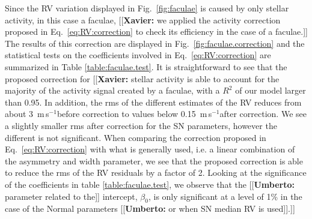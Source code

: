 \documentclass{aa}
\def\ms{\hbox{\,m\,s$^{-1}$}}         %
\newcommand{\xavier}[1]{{\color{blue}[[\textbf{Xavier: }#1]]}}
\newcommand{\umberto}[1]{{\color{green}[[\textbf{Umberto: }#1]]}}
\begin{document}
Since the RV variation displayed in Fig.~\ref{fig:faculae} is caused by only stellar activity, in this case a faculae, \xavier{we applied the activity correction proposed in Eq.~\ref{eq:RV:correction} to check its efficiency in the case of a faculae.} The results of this correction are displayed in Fig.~\ref{fig:faculae.correction} and the statistical tests on the coefficients involved in Eq.~\ref{eq:RV:correction} are summarized in Table \ref{table:faculae.test}. 
It is straightforward to see that the proposed correction for \xavier{stellar activity is able to account for the majority of the activity signal created by a faculae, with a $R^2$ of our model larger than 0.95. In addition, the rms of the different estimates of the RV reduces from about 3 \ms before correction to values below 0.15 \ms after correction.
We see a slightly smaller rms after correction for the SN parameters, however the different is not significant. When comparing the correction proposed in Eq.~\ref{eq:RV:correction} with what is generally used, i.e. a linear combination of the asymmetry and width parameter, we see that the proposed correction is able to reduce the rms of the RV residuals by a factor of 2. Looking at the significance of the coefficients in table \ref{table:faculae.test}, we observe that the \umberto{parameter related to the} intercept, $\beta_0$, is only significant at a level of 1\% in the case of the Normal parameters \umberto{or when SN median RV is used}.}
\end{document}
